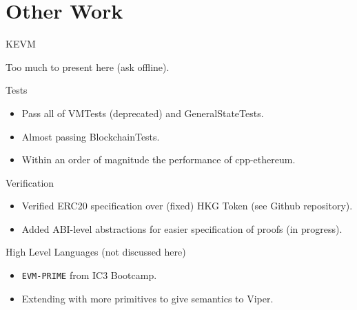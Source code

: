 \documentclass[8pt,ignorenonframetext,]{beamer}
\providecommand{\tightlist}{%
  \setlength{\itemsep}{0pt}\setlength{\parskip}{0pt}}
\begin{document}
\section{Other Work}\label{other-work}

\begin{frame}[fragile]{KEVM}

Too much to present here (ask offline).

\begin{block}{Tests}

\begin{itemize}
\tightlist
\item
  Pass all of VMTests (deprecated) and GeneralStateTests.
\item
  Almost passing BlockchainTests.
\item
  Within an order of magnitude the performance of cpp-ethereum.
\end{itemize}

\end{block}

\begin{block}{Verification}

\begin{itemize}
\tightlist
\item
  Verified ERC20 specification over (fixed) HKG Token (see Github
  repository).
\item
  Added ABI-level abstractions for easier specification of proofs (in
  progress).
\end{itemize}

\end{block}

\begin{block}{High Level Languages (not discussed here)}

\begin{itemize}
\tightlist
\item
  \texttt{EVM-PRIME} from IC3 Bootcamp.
\item
  Extending with more primitives to give semantics to Viper.
\end{itemize}

\end{block}

\end{frame}
\end{document}
